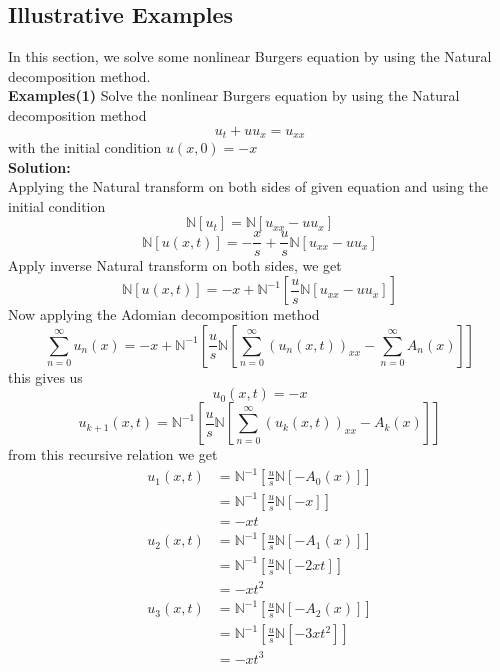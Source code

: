 \subsection{Illustrative Examples}
In this section, we solve some nonlinear Burgers equation by using the Natural decomposition method.\\
\textbf{Examples(1)} Solve the nonlinear Burgers equation by using the Natural decomposition method
\begin{equation*}
  u_{t}+uu_{x}=u_{xx}
 \end{equation*}
with the initial condition $u(x,0)=-x$\\
\textbf{Solution:}\\
Applying the Natural transform on both sides of given equation and using the initial condition
\begin{equation*}
\mathbb{N}[u_{t}]=\mathbb{N}[u_{xx}-uu_{x}]
\end{equation*}
\begin{equation*}
\mathbb{N}[u(x,t)]=-\frac{x}{s}+\frac{u}{s}\mathbb{N}[u_{xx}-uu_{x}]
\end{equation*}
Apply inverse Natural transform on both sides, we get
\begin{equation*}
\mathbb{N}[u(x,t)]=-x+\mathbb{N}^{-1}[\frac{u}{s}\mathbb{N}[u_{xx}-uu_{x}]]
\end{equation*}
Now applying the Adomian decomposition method
\begin{equation}
\sum_{n=0}^{\infty} u_{n}(x)=-x+\mathbb{N}^{-1}[\frac{u}{s}\mathbb{N}[\sum_{n=0}^{\infty} (u_{n}(x,t))_{xx}-\sum_{n=0}^{\infty} A_{n}(x)]]
\end{equation}
this gives us
\begin{equation*}
u_{0}(x,t)= -x  
\end{equation*}
\begin{equation*}
u_{k+1}(x,t) = \mathbb{N}^{-1}[\frac{u}{s}\mathbb{N}[\sum_{n=0}^{\infty} (u_{k}(x,t))_{xx}- A_{k}(x)]]
\end{equation*}
from this recursive relation we get
\begin{align*}
u_{1}(x,t)&=\mathbb{N}^{-1}[\frac{u}{s}\mathbb{N}[- A_{0}(x)]]\\
&= \mathbb{N}^{-1}[\frac{u}{s}\mathbb{N}[- x]]\\
&=-xt\\
u_{2}(x,t)&=\mathbb{N}^{-1}[\frac{u}{s}\mathbb{N}[- A_{1}(x)]]\\
&= \mathbb{N}^{-1}[\frac{u}{s}\mathbb{N}[- 2xt]]\\
&=-xt^2\\
u_{3}(x,t)&=\mathbb{N}^{-1}[\frac{u}{s}\mathbb{N}[- A_{2}(x)]]\\
&= \mathbb{N}^{-1}[\frac{u}{s}\mathbb{N}[- 3xt^2]]\\
&=-xt^3
\end{align*}
